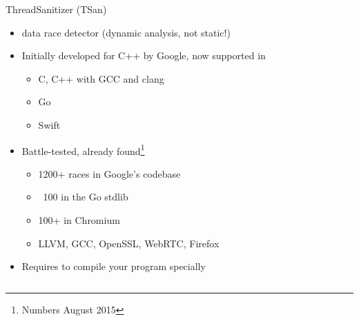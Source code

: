 \begin{frame}{ThreadSanitizer (TSan)}
  \begin{itemize}
    \item {} data race detector (dynamic analysis, not static!)
    \item Initially developed for C++ by Google, now supported in
      \begin{footnotesize}
        \begin{itemize}
          \item C, C++ with GCC and clang
          \item Go
          \item Swift
        \end{itemize}
      \end{footnotesize}
    \item Battle-tested, already found\footnote[frame]{Numbers August 2015}
      \begin{footnotesize}
        \begin{itemize}
          \item 1200+ races in Google’s codebase
          \item ~100 in the Go stdlib
          \item 100+ in Chromium
          \item LLVM, GCC, OpenSSL, WebRTC, Firefox
        \end{itemize}
      \end{footnotesize}
      \bigskip
    \item Requires to compile your program specially
  \end{itemize}
\end{frame}

\begin{frame}{}
  \vspace{6pt}
  \begin{columns}[c]
    \begin{column}{0.4\textwidth}
    \end{column}
    \begin{column}{0.67\textwidth}
    \end{column}
  \end{columns}
\end{frame}

